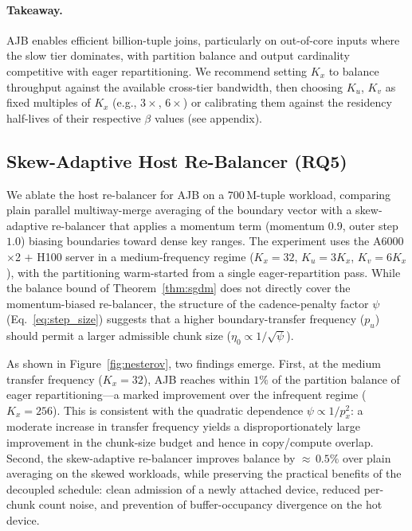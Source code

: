 \documentclass{article}
\begin{document}
\paragraph{Takeaway.}
AJB enables efficient billion-tuple joins, particularly on out-of-core inputs
where the slow tier dominates, with partition balance and output cardinality
competitive with eager repartitioning. We recommend setting $K_x$ to balance
throughput against the available cross-tier bandwidth, then choosing $K_u$,
$K_v$ as fixed multiples of $K_x$ (e.g., $3\times$, $6\times$) or calibrating
them against the residency half-lives of their respective $\beta$ values
(see appendix).

\subsection{Skew-Adaptive Host Re-Balancer (RQ5)}
\label{sec:rq5}

We ablate the host re-balancer for AJB on a $700$\,M-tuple workload, comparing
plain parallel multiway-merge averaging of the boundary vector with a
skew-adaptive re-balancer that applies a momentum term (momentum $0.9$, outer
step $1.0$) biasing boundaries toward dense key ranges. The experiment uses the
A6000$\times$2 $+$ H100 server in a medium-frequency regime ($K_x = 32$, $K_u =
3K_x$, $K_v = 6K_x$), with the partitioning warm-started from a single
eager-repartition pass. While the balance bound of Theorem~\ref{thm:sgdm} does
not directly cover the momentum-biased re-balancer, the structure of the
cadence-penalty factor $\psi$ (Eq.~\ref{eq:step_size}) suggests that a higher
boundary-transfer frequency ($p_u$) should permit a larger admissible chunk size
($\eta_0 \propto 1/\sqrt{\psi}$).

As shown in Figure~\ref{fig:nesterov}, two findings emerge. First, at the medium
transfer frequency ($K_x = 32$), AJB reaches within $1\%$ of the partition
balance of eager repartitioning---a marked improvement over the infrequent
regime ($K_x = 256$). This is consistent with the quadratic dependence $\psi
\propto 1/p_x^2$: a moderate increase in transfer frequency yields a
disproportionately large improvement in the chunk-size budget and hence in
copy/compute overlap. Second, the skew-adaptive re-balancer improves balance by
${\approx}\,0.5\%$ over plain averaging on the skewed workloads, while preserving
the practical benefits of the decoupled schedule: clean admission of a newly
attached device, reduced per-chunk count noise, and prevention of
buffer-occupancy divergence on the hot device.
\end{document}
